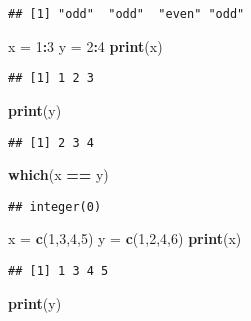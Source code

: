 \documentclass[]{article}
\newenvironment{Shaded}{\begin{snugshade}}{\end{snugshade}}
\newcommand{\KeywordTok}[1]{\textcolor[rgb]{0.13,0.29,0.53}{\textbf{#1}}}
\newcommand{\DecValTok}[1]{\textcolor[rgb]{0.00,0.00,0.81}{#1}}
\newcommand{\StringTok}[1]{\textcolor[rgb]{0.31,0.60,0.02}{#1}}
\newcommand{\OperatorTok}[1]{\textcolor[rgb]{0.81,0.36,0.00}{\textbf{#1}}}
\newcommand{\NormalTok}[1]{#1}
\begin{document}
\begin{verbatim}
## [1] "odd"  "odd"  "even" "odd"
\end{verbatim}

\begin{Shaded}
\begin{Highlighting}[]
\NormalTok{x =}\StringTok{ }\DecValTok{1}\OperatorTok{:}\DecValTok{3}
\NormalTok{y =}\StringTok{ }\DecValTok{2}\OperatorTok{:}\DecValTok{4}
\KeywordTok{print}\NormalTok{(x)}
\end{Highlighting}
\end{Shaded}

\begin{verbatim}
## [1] 1 2 3
\end{verbatim}

\begin{Shaded}
\begin{Highlighting}[]
\KeywordTok{print}\NormalTok{(y)}
\end{Highlighting}
\end{Shaded}

\begin{verbatim}
## [1] 2 3 4
\end{verbatim}

\begin{Shaded}
\begin{Highlighting}[]
\KeywordTok{which}\NormalTok{(x }\OperatorTok{==}\StringTok{ }\NormalTok{y)}
\end{Highlighting}
\end{Shaded}

\begin{verbatim}
## integer(0)
\end{verbatim}

\begin{Shaded}
\begin{Highlighting}[]
\NormalTok{x =}\StringTok{ }\KeywordTok{c}\NormalTok{(}\DecValTok{1}\NormalTok{,}\DecValTok{3}\NormalTok{,}\DecValTok{4}\NormalTok{,}\DecValTok{5}\NormalTok{)}
\NormalTok{y =}\StringTok{ }\KeywordTok{c}\NormalTok{(}\DecValTok{1}\NormalTok{,}\DecValTok{2}\NormalTok{,}\DecValTok{4}\NormalTok{,}\DecValTok{6}\NormalTok{)}
\KeywordTok{print}\NormalTok{(x)}
\end{Highlighting}
\end{Shaded}

\begin{verbatim}
## [1] 1 3 4 5
\end{verbatim}

\begin{Shaded}
\begin{Highlighting}[]
\KeywordTok{print}\NormalTok{(y)}
\end{Highlighting}
\end{Shaded}
\end{document}
